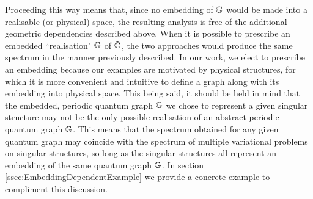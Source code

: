 Proceeding this way means that, since no embedding of $\tilde{\mathbb{G}}$ would be made into a realisable (or physical) space, the resulting analysis is free of the additional geometric dependencies described above.
When it is possible to prescribe an embedded ``realisation" $\mathbb{G}$ of $\tilde{\mathbb{G}}$, the two approaches would produce the same spectrum in the manner previously described.
In our work, we elect to prescribe an embedding because our examples are motivated by physical structures, for which it is more convenient and intuitive to define a graph along with its embedding into physical space.
This being said, it should be held in mind that the embedded, periodic quantum graph $\mathbb{G}$ we chose to represent a given singular structure may not be the only possible realisation of an abstract periodic quantum graph $\tilde{\mathbb{G}}$.
This means that the spectrum obtained for any given quantum graph may coincide with the spectrum of multiple variational problems on singular structures, so long as the singular structures all represent an embedding of the same quantum graph $\tilde{\mathbb{G}}$.
In section \ref{ssec:EmbeddingDependentExample} we provide a concrete example to compliment this discussion.